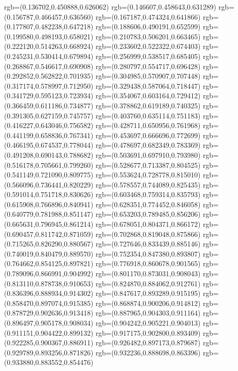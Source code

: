 {{{			rgb=(0.136702,0.450888,0.626062)
			rgb=(0.146607,0.458643,0.631289)
			rgb=(0.156787,0.466457,0.636560)
			rgb=(0.167187,0.474324,0.641866)
			rgb=(0.177807,0.482238,0.647218)
			rgb=(0.188606,0.490191,0.652599)
			rgb=(0.199580,0.498193,0.658021)
			rgb=(0.210783,0.506201,0.663465)
			rgb=(0.222120,0.514263,0.668924)
			rgb=(0.233602,0.522322,0.674403)
			rgb=(0.245231,0.530414,0.679894)
			rgb=(0.256999,0.538517,0.685405)
			rgb=(0.268867,0.546617,0.690908)
			rgb=(0.280797,0.554717,0.696428)
			rgb=(0.292852,0.562822,0.701935)
			rgb=(0.304985,0.570907,0.707448)
			rgb=(0.317174,0.578997,0.712950)
			rgb=(0.329438,0.587064,0.718447)
			rgb=(0.341729,0.595123,0.723934)
			rgb=(0.354067,0.603164,0.729412)
			rgb=(0.366459,0.611186,0.734877)
			rgb=(0.378862,0.619189,0.740325)
			rgb=(0.391305,0.627159,0.745757)
			rgb=(0.403760,0.635114,0.751183)
			rgb=(0.416227,0.643046,0.756582)
			rgb=(0.428711,0.650956,0.761968)
			rgb=(0.441199,0.658836,0.767341)
			rgb=(0.453697,0.666696,0.772699)
			rgb=(0.466195,0.674537,0.778044)
			rgb=(0.478697,0.682349,0.783369)
			rgb=(0.491208,0.690143,0.788682)
			rgb=(0.503691,0.697910,0.793980)
			rgb=(0.516178,0.705661,0.799260)
			rgb=(0.528677,0.713387,0.804525)
			rgb=(0.541149,0.721090,0.809775)
			rgb=(0.553624,0.728778,0.815010)
			rgb=(0.566096,0.736441,0.820229)
			rgb=(0.578557,0.744089,0.825435)
			rgb=(0.591014,0.751718,0.830626)
			rgb=(0.603468,0.759314,0.835793)
			rgb=(0.615908,0.766896,0.840941)
			rgb=(0.628351,0.774452,0.846058)
			rgb=(0.640779,0.781988,0.851147)
			rgb=(0.653203,0.789485,0.856206)
			rgb=(0.665631,0.796945,0.861214)
			rgb=(0.678051,0.804371,0.866172)
			rgb=(0.690457,0.811742,0.871059)
			rgb=(0.702868,0.819048,0.875866)
			rgb=(0.715265,0.826290,0.880567)
			rgb=(0.727646,0.833439,0.885146)
			rgb=(0.740019,0.840479,0.889570)
			rgb=(0.752354,0.847380,0.893807)
			rgb=(0.764662,0.854125,0.897821)
			rgb=(0.776918,0.860678,0.901565)
			rgb=(0.789096,0.866991,0.904992)
			rgb=(0.801170,0.873031,0.908043)
			rgb=(0.813110,0.878738,0.910653)
			rgb=(0.824870,0.884062,0.912761)
			rgb=(0.836396,0.888934,0.914302)
			rgb=(0.847617,0.893289,0.915195)
			rgb=(0.858470,0.897074,0.915385)
			rgb=(0.868874,0.900206,0.914812)
			rgb=(0.878729,0.902636,0.913418)
			rgb=(0.887965,0.904303,0.911164)
			rgb=(0.896497,0.905178,0.908034)
			rgb=(0.904242,0.905221,0.904013)
			rgb=(0.911151,0.904422,0.899132)
			rgb=(0.917175,0.902800,0.893409)
			rgb=(0.922285,0.900367,0.886911)
			rgb=(0.926482,0.897173,0.879687)
			rgb=(0.929789,0.893256,0.871826)
			rgb=(0.932236,0.888698,0.863396)
			rgb=(0.933880,0.883552,0.854476)
}}}
